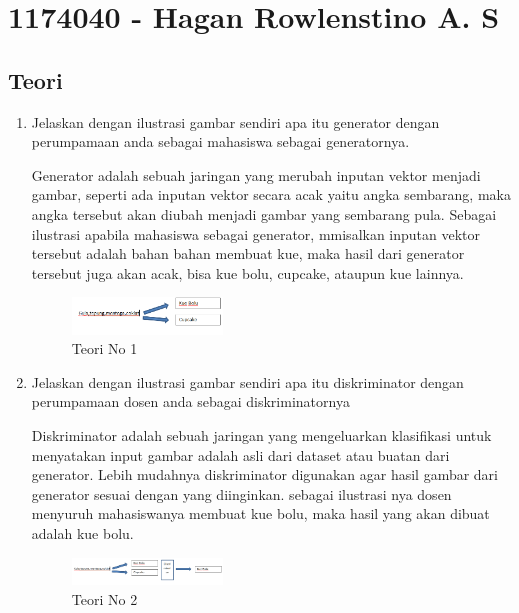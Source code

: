 \section{1174040 - Hagan Rowlenstino A. S}
    \subsection{Teori}
        \begin{enumerate}
            \item Jelaskan dengan ilustrasi gambar sendiri apa itu generator dengan perumpamaan anda sebagai mahasiswa sebagai generatornya.
            \par Generator adalah sebuah jaringan yang merubah inputan vektor menjadi gambar, seperti ada inputan vektor secara acak yaitu angka sembarang, maka angka tersebut akan diubah menjadi gambar yang sembarang pula. Sebagai ilustrasi apabila mahasiswa sebagai generator, mmisalkan inputan vektor tersebut adalah bahan bahan membuat kue, maka hasil dari generator tersebut juga akan acak, bisa kue bolu, cupcake, ataupun kue lainnya.
            \begin{figure}[H]
                \includegraphics[width=4cm]{figures/1174040/chapter8/teori1.png}
                \centering
                  \caption{Teori No 1}
            \end{figure}

            \item Jelaskan dengan ilustrasi gambar sendiri apa itu diskriminator dengan perumpamaan dosen anda sebagai diskriminatornya
            \par Diskriminator adalah sebuah jaringan yang mengeluarkan klasifikasi untuk menyatakan input gambar adalah asli dari dataset atau buatan dari generator. Lebih mudahnya diskriminator digunakan agar hasil gambar dari generator sesuai dengan yang diinginkan. sebagai ilustrasi nya dosen menyuruh mahasiswanya membuat kue bolu, maka hasil yang akan dibuat adalah kue bolu.
            \begin{figure}[H]
                \includegraphics[width=4cm]{figures/1174040/chapter8/teori2.png}
                \centering
                  \caption{Teori No 2}
            \end{figure}


\end{enumerate}

